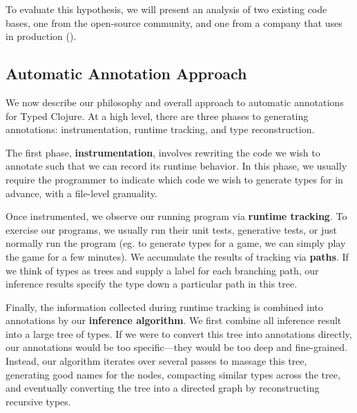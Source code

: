\documentclass[9pt]{extarticle}
\begin{document}
To evaluate this hypothesis, we will present an analysis of two existing \coretyped{}
code bases, one from the open-source community, and one from a company
that uses \coretyped{} in production ().

\subsection{Automatic Annotation Approach}

We now describe our philosophy and overall approach to automatic annotations for Typed Clojure.
At a high level, there are three phases to
generating annotations: instrumentation, runtime tracking, and type reconstruction.

The first phase, \textbf{instrumentation}, involves
rewriting the code we wish to annotate such
that we can record its runtime behavior.
In this phase, we usually require the programmer to
indicate which code we wish to generate types
for in advance, with a file-level granuality.

Once instrumented, we observe our running program
via \textbf{runtime tracking}. To exercise our programs,
we usually run their unit tests, generative tests,
or just normally run the program (eg. to generate types for
a game, we can simply play the game for a few minutes).
We accumulate the results of tracking via \textbf{paths}.
If we think of types as trees and supply a label
for each branching path, our inference results
specify the type down a particular path in this tree.

Finally, the information collected during runtime tracking
is combined into annotations by our \textbf{inference algorithm}.
We first combine all inference result into a large tree of
types. If we were to convert this tree into annotations directly,
our annotations would be too specific---they would be too
deep and fine-grained.
Instead, our algorithm iterates over several passes to massage
this tree, generating good names for the nodes, compacting similar
types across the tree, and
eventually converting the tree into a directed graph by reconstructing
recursive types.

%
%
%
\end{document}
